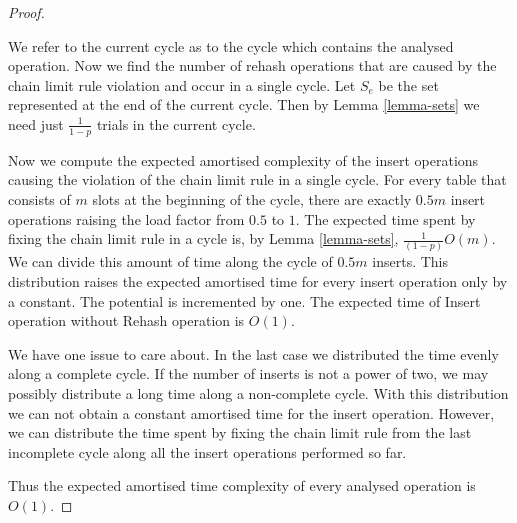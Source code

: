 \begin{proof}
\begin{itemize}
We refer to the current cycle as to the cycle which contains the analysed operation. Now we find the number of rehash operations that are caused by the chain limit rule violation and occur in a single cycle. Let $S_e$ be the set represented at the end of the current cycle. Then by Lemma \ref{lemma-sets} we need just $\frac{1}{1 - p}$ trials in the current cycle.

Now we compute the expected amortised complexity of the insert operations causing the violation of the chain limit rule in a single cycle. For every table that consists of $m$ slots at the beginning of the cycle, there are exactly $0.5 m$ insert operations raising the load factor from $0.5$ to $1$. The expected time spent by fixing the chain limit rule in a cycle is, by Lemma \ref{lemma-sets}, $\frac{1}{(1 - p)}O(m)$. We can divide this amount of time along the cycle of $0.5 m$ inserts. This distribution raises the expected amortised time for every insert operation only by a constant. The potential is incremented by one. The expected time of Insert operation without Rehash operation is $O(1)$.
\end{itemize}

We have one issue to care about. In the last case we distributed the time evenly along a complete cycle. If the number of inserts is not a power of two, we may possibly distribute a long time along a non-complete cycle. With this distribution we can not obtain a constant amortised time for the insert operation. However, we can distribute the time spent by fixing the chain limit rule from the last incomplete cycle along all the insert operations performed so far.

Thus the expected amortised time complexity of every analysed operation is $O(1)$.
\end{proof}

